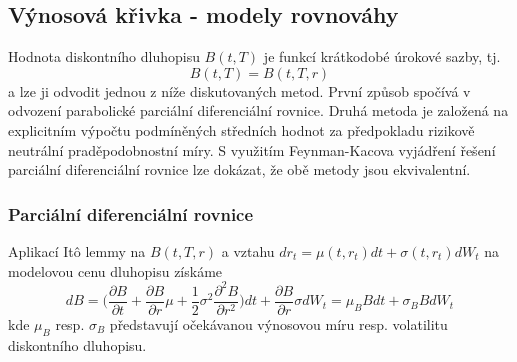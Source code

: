 \documentclass[a4paper]{book}
\begin{document}
\subsection{Výnosová křivka - modely rovnováhy}

Hodnota diskontního dluhopisu $B(t,T)$ je funkcí krátkodobé úrokové sazby, tj.
\begin{equation*}
B(t,T) = B(t,T,r)
\end{equation*}
a lze ji odvodit jednou z níže diskutovaných metod. První způsob spočívá v odvození parabolické parciální diferenciální rovnice. Druhá metoda je založená na explicitním výpočtu podmíněných středních hodnot za předpokladu rizikově neutrální praděpodobnostní míry. S využitím Feynman-Kacova vyjádření řešení parciální diferenciální rovnice lze dokázat, že obě metody jsou ekvivalentní.

\subsubsection{Parciální diferenciální rovnice}

Aplikací It\^o lemmy na $B(t,T,r)$ a vztahu $d r_t = \mu(t,r_t)dt + \sigma(t,r_t)d W_t$ na modelovou cenu dluhopisu získáme
\begin{equation}
dB = \Big( \frac{\partial B}{\partial t} + \frac{\partial B}{\partial r}\mu + \frac{1}{2}\sigma^2 \frac{\partial^2 B}{\partial r^2}\Big)dt + \frac{\partial B}{\partial r}\sigma d W_t = \mu_B B dt + \sigma_B B d W_t
\end{equation}
kde $\mu_B$ resp. $\sigma_B$ představují očekávanou výnosovou míru resp. volatilitu diskontního dluhopisu.
\end{document}

